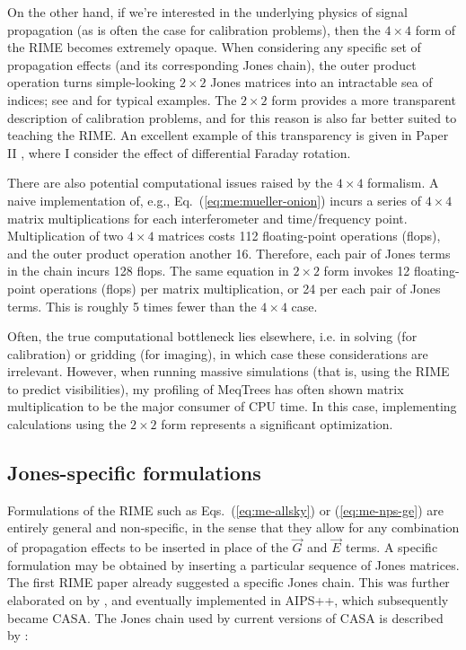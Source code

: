 \documentclass{aa}
\newcommand{\jones}[2]{\vec {#1}_{#2}}
\begin{document}
On the other hand, if we're interested in the underlying physics of signal propagation (as is often the case for calibration problems), then the $4\times4$ form of the RIME becomes extremely opaque. When considering any specific set of propagation effects (and its corresponding Jones chain), the outer product operation turns simple-looking $2\times2$ Jones matrices into an intractable sea of indices; see \citet[Eq. 4]{SB:imageplane} and \citet[Appendix A]{ME1} for typical examples. The $2\times2$ form provides a more transparent description of calibration problems, and for this reason is also far better suited to teaching the RIME. An excellent example of this transparency is given in Paper II \citep[Sect.~2.2.2]{RRIME2}, where I consider the effect of differential Faraday rotation.

There are also potential computational issues raised by the $4\times4$ formalism. A naive implementation of, e.g., Eq.~(\ref{eq:me:mueller-onion}) incurs a series of $4\times4$ matrix multiplications for each interferometer and time/frequency point. Multiplication of two $4\times4$ matrices costs 112 floating-point operations (flops), and the outer product operation another 16. Therefore, each pair of Jones terms in the chain incurs 128 flops. The same equation in $2\times2$ form invokes 12 floating-point operations (flops) per matrix multiplication, or 24 per each pair of Jones terms. This is roughly 5 times fewer than the $4\times4$ case. 

Often, the true computational bottleneck lies elsewhere, i.e. in solving (for calibration) or gridding (for imaging), in which case these considerations are irrelevant. However, when running massive simulations (that is, using the RIME to predict visibilities), my profiling of MeqTrees has often shown matrix multiplication to be the major consumer of CPU time. In this case, implementing calculations using the $2\times2$ form represents a significant optimization.

\subsection{Jones-specific formulations\label{sec:jones-specific}} 

Formulations of the RIME such as Eqs.~(\ref{eq:me-allsky}) or (\ref{eq:me-nps-ge}) are entirely general and non-specific, in the sense that they allow for any combination of propagation effects to be inserted in place of the $\jones{G}{}$ and $\jones{E}{}$ terms. A specific formulation may be obtained by inserting a particular sequence of Jones matrices. The first RIME paper \citep{ME1} already suggested a specific Jones chain. This was further elaborated on by \citet{JEN:note185}, and eventually implemented in AIPS++, which subsequently became CASA. The Jones chain used by current versions of CASA is described by \citet[Appendix E.1]{CASA:UserRef}:
\end{document}
